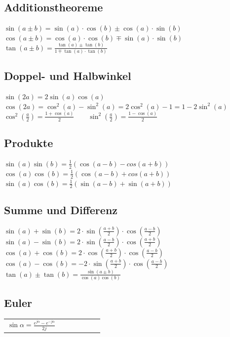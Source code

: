 \begin{minipage}{10.5cm}
  \subsection{Additionstheoreme}
    $\sin(a \pm b)=\sin(a) \cdot \cos(b) \pm \cos(a) \cdot \sin(b)$\\
    $\cos(a \pm b)=\cos(a) \cdot \cos(b) \mp \sin(a) \cdot \sin(b)$\\ 
    $\tan(a \pm b)=\frac{\tan(a) \pm \tan(b)}{1 \mp \tan(a) \cdot \tan(b)}$
    
  \subsection{Doppel- und Halbwinkel} 
    $\sin(2a)=2\sin(a)\cos(a)$\\
    $\cos(2a)=\cos^2(a)-\sin^2(a)=2\cos^2(a)-1=1-2\sin^2(a)$\\
    $\cos^2 \left(\frac{a}{2}\right)=\frac{1+\cos(a)}{2} \qquad
    \sin^2 \left(\frac{a}{2}\right)=\frac{1-\cos(a)}{2}$
    
  \subsection{Produkte}
    $\sin(a)\sin(b)=\frac{1}{2}(\cos(a-b)-cos(a+b))$\\
    $\cos(a)\cos(b)=\frac{1}{2}(\cos(a-b)+cos(a+b))$\\
    $\sin(a)\cos(b)=\frac{1}{2}(\sin(a-b)+\sin(a+b))$
    
  \subsection{Summe und Differenz}
    $\sin(a)+\sin(b)=2 \cdot \sin \left(\frac{a+b}{2}\right) \cdot
    \cos\left(\frac{a-b}{2}\right)$\\
    $\sin(a)-\sin(b)=2 \cdot \sin \left(\frac{a-b}{2}\right) \cdot
    \cos\left(\frac{a+b}{2}\right)$\\
    $\cos(a)+\cos(b)=2 \cdot \cos \left(\frac{a+b}{2}\right) \cdot
    \cos\left(\frac{a-b}{2}\right)$\\
    $\cos(a)-\cos(b)=-2 \cdot \sin \left(\frac{a+b}{2}\right) \cdot
    \cos\left(\frac{a-b}{2}\right)$\\
    $\tan(a) \pm \tan(b)=\frac{\sin(a \pm b)}{\cos(a)\cos(b)}$  
    
  \subsection{Euler}
    \begin{tabular}{lllllll}
      $\sin{\alpha} = \frac{e^{j\alpha} - e^{-j\alpha}}{2j}$ &


\end{tabular}
\end{minipage}
